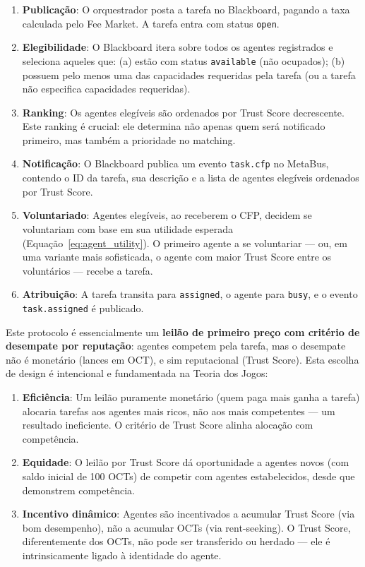 \begin{enumerate}
    \item \textbf{Publicação}: O orquestrador posta a tarefa no Blackboard, pagando a taxa calculada pelo Fee Market. A tarefa entra com status \texttt{open}.
    
    \item \textbf{Elegibilidade}: O Blackboard itera sobre todos os agentes registrados e seleciona aqueles que: (a) estão com status \texttt{available} (não ocupados); (b) possuem pelo menos uma das capacidades requeridas pela tarefa (ou a tarefa não especifica capacidades requeridas).
    
    \item \textbf{Ranking}: Os agentes elegíveis são ordenados por Trust Score decrescente. Este ranking é crucial: ele determina não apenas quem será notificado primeiro, mas também a prioridade no matching.
    
    \item \textbf{Notificação}: O Blackboard publica um evento \texttt{task.cfp} no MetaBus, contendo o ID da tarefa, sua descrição e a lista de agentes elegíveis ordenados por Trust Score.
    
    \item \textbf{Voluntariado}: Agentes elegíveis, ao receberem o CFP, decidem se voluntariam com base em sua utilidade esperada (Equação~\eqref{eq:agent_utility}). O primeiro agente a se voluntariar --- ou, em uma variante mais sofisticada, o agente com maior Trust Score entre os voluntários --- recebe a tarefa.
    
    \item \textbf{Atribuição}: A tarefa transita para \texttt{assigned}, o agente para \texttt{busy}, e o evento \texttt{task.assigned} é publicado.
\end{enumerate}

Este protocolo é essencialmente um \textbf{leilão de primeiro preço com critério de desempate por reputação}: agentes competem pela tarefa, mas o desempate não é monetário (lances em OCT), e sim reputacional (Trust Score). Esta escolha de design é intencional e fundamentada na Teoria dos Jogos:

\begin{enumerate}
    \item \textbf{Eficiência}: Um leilão puramente monetário (quem paga mais ganha a tarefa) alocaria tarefas aos agentes mais ricos, não aos mais competentes --- um resultado ineficiente. O critério de Trust Score alinha alocação com competência.
    
    \item \textbf{Equidade}: O leilão por Trust Score dá oportunidade a agentes novos (com saldo inicial de 100 OCTs) de competir com agentes estabelecidos, desde que demonstrem competência.
    
    \item \textbf{Incentivo dinâmico}: Agentes são incentivados a acumular Trust Score (via bom desempenho), não a acumular OCTs (via rent-seeking). O Trust Score, diferentemente dos OCTs, não pode ser transferido ou herdado --- ele é intrinsicamente ligado à identidade do agente.
\end{enumerate}

